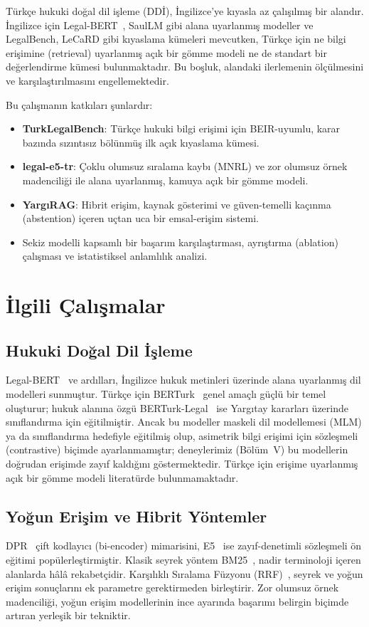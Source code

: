 \documentclass[conference]{IEEEtran}
\begin{document}
Türkçe hukuki doğal dil işleme (DDİ), İngilizce'ye kıyasla az çalışılmış bir alandır. İngilizce için Legal-BERT~\cite{chalkidis2020legalbert}, SaulLM gibi alana uyarlanmış modeller ve LegalBench, LeCaRD gibi kıyaslama kümeleri mevcutken, Türkçe için ne bilgi erişimine (retrieval) uyarlanmış açık bir gömme modeli ne de standart bir değerlendirme kümesi bulunmaktadır. Bu boşluk, alandaki ilerlemenin ölçülmesini ve karşılaştırılmasını engellemektedir.

Bu çalışmanın katkıları şunlardır:
\begin{itemize}
\item \textbf{TurkLegalBench}: Türkçe hukuki bilgi erişimi için BEIR-uyumlu, karar bazında sızıntısız bölünmüş ilk açık kıyaslama kümesi.
\item \textbf{legal-e5-tr}: Çoklu olumsuz sıralama kaybı (MNRL) ve zor olumsuz örnek madenciliği ile alana uyarlanmış, kamuya açık bir gömme modeli.
\item \textbf{YargıRAG}: Hibrit erişim, kaynak gösterimi ve güven-temelli kaçınma (abstention) içeren uçtan uca bir emsal-erişim sistemi.
\item Sekiz modelli kapsamlı bir başarım karşılaştırması, ayrıştırma (ablation) çalışması ve istatistiksel anlamlılık analizi.
\end{itemize}

\section{İlgili Çalışmalar}
\subsection{Hukuki Doğal Dil İşleme}
Legal-BERT~\cite{chalkidis2020legalbert} ve ardılları, İngilizce hukuk metinleri üzerinde alana uyarlanmış dil modelleri sunmuştur. Türkçe için BERTurk~\cite{schweter2020berturk} genel amaçlı güçlü bir temel oluşturur; hukuk alanına özgü BERTurk-Legal~\cite{berturklegal} ise Yargıtay kararları üzerinde sınıflandırma için eğitilmiştir. Ancak bu modeller maskeli dil modellemesi (MLM) ya da sınıflandırma hedefiyle eğitilmiş olup, asimetrik bilgi erişimi için sözleşmeli (contrastive) biçimde ayarlanmamıştır; deneylerimiz (Bölüm~V) bu modellerin doğrudan erişimde zayıf kaldığını göstermektedir. Türkçe için erişime uyarlanmış açık bir gömme modeli literatürde bulunmamaktadır.

\subsection{Yoğun Erişim ve Hibrit Yöntemler}
DPR~\cite{karpukhin2020dpr} çift kodlayıcı (bi-encoder) mimarisini, E5~\cite{wang2022e5} ise zayıf-denetimli sözleşmeli ön eğitimi popülerleştirmiştir. Klasik seyrek yöntem BM25~\cite{robertson2009bm25}, nadir terminoloji içeren alanlarda hâlâ rekabetçidir. Karşılıklı Sıralama Füzyonu (RRF)~\cite{cormack2009rrf}, seyrek ve yoğun erişim sonuçlarını ek parametre gerektirmeden birleştirir. Zor olumsuz örnek madenciliği, yoğun erişim modellerinin ince ayarında başarımı belirgin biçimde artıran yerleşik bir tekniktir.
\end{document}
